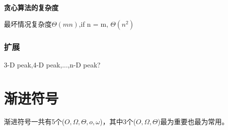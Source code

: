 \documentclass[11pt]{article}
\begin{document}
\begin{CJK}{UTF8}{gbsn}
\textbf{贪心算法的复杂度}

最坏情况复杂度$\Theta(mn)$,if n = m, $\Theta(n^2)$

\subsubsection{扩展}

3-D peak,4-D peak,...,n-D peak?

\section{渐进符号}

渐进符号一共有5个($O,\Omega,\Theta, o, \omega$)，其中3个($O,\Omega,\Theta$)最为重要也最为常用。







\end{CJK}
\end{document}
